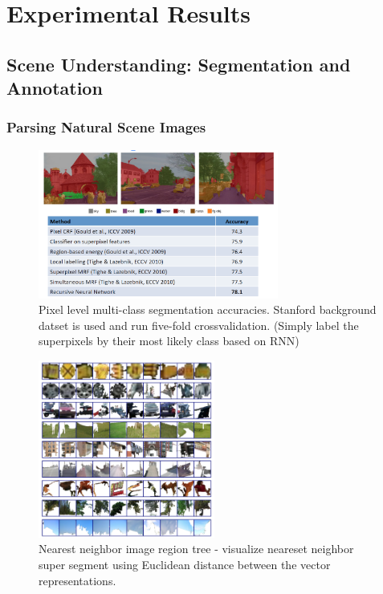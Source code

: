 \documentclass{beamer}
\begin{document}
\section{Experimental Results}
\frame{\tableofcontents}
\subsection{Scene Understanding: Segmentation and Annotation}
\frame
{
  \frametitle{Parsing Natural Scene Images}
  \begin{figure}[ht]  
  	\begin{center}
  		\includegraphics[width=3.1in]{images/ex5.png}   
		\caption{Pixel level multi-class segmentation accuracies. Stanford background datset is used and run five-fold crossvalidation. (Simply label the superpixels by their most likely class based on RNN)}
	\end{center}
  \end{figure}
}
\frame
{
  \begin{figure}[ht]  
  	\begin{center}
  		\includegraphics[height=2.3in]{images/ex2.png}   
		\caption{Nearest neighbor image region tree - visualize neareset neighbor super segment using Euclidean distance between the vector representations.}
	\end{center}
  \end{figure}
}
\frame
\end{document}
